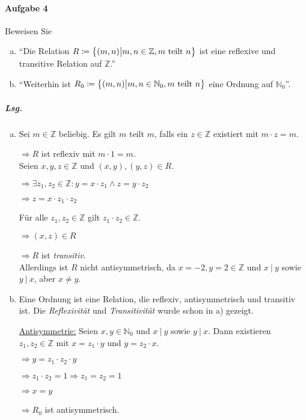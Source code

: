 \documentclass{scrreprt}
\begin{document}
\newpage
\paragraph{Aufgabe 4} Beweisen Sie
\begin{enumerate}[a)]
\item ``Die Relation
$R \coloneqq \qty\big{\qty(m, n) {\big |} m, n \in \mathbb{Z},
m \text{ teilt } n}$ ist eine reflexive und transitive Relation auf
$\mathbb{Z}$.''

\item ``Weiterhin ist
$R_0 \coloneqq \qty\big{(m, n) {\big |} m, n \in \mathbb{N}_0,
  m \text{ teilt } n}$ eine Ordnung auf $\mathbb{N}_0$''.
\end{enumerate}

\subparagraph{Lsg.}
\begin{enumerate}[a)]
\item Sei $m \in \mathbb{Z}$ beliebig.
Es gilt $m$ teilt $m$, falls ein $z \in \mathbb{Z}$ existiert mit
$m \cdot z = m$.

$\Rightarrow R$ ist reflexiv mit $m \cdot 1 = m$. \\

Seien $x, y, z \in \mathbb{Z}$ und $(x, y), (y, z) \in R$.

  $\Rightarrow \exists z_1, z_2 \in \mathbb{Z} \colon y = x \cdot z_1 \land z = y \cdot z_2$

  $\Rightarrow z = x \cdot z_1 \cdot z_2$

  Für alle $z_1, z_2 \in \mathbb{Z}$ gilt $z_1 \cdot z_2 \in \mathbb{Z}$.

  $\Rightarrow (x, z) \in R$

  $\Rightarrow R$ ist \emph{transitiv}. \\

  Allerdings ist $R$ nicht antisymmetrisch, da $x = -2, y = 2 \in \mathbb{Z}$
  und $x \:|\: y$ sowie $y \:|\: x$, aber $x \ne y$.

\item Eine Ordnung ist eine Relation, die reflexiv, antisymmetrisch und transitiv ist.
  Die \emph{Reflexivität} und \emph{Transitivität} wurde schon in a) gezeigt.

  \underline{Antisymmetrie:} Seien $x, y \in \mathbb{N}_0$ und $x \:|\: y$ sowie
  $y \:|\: x$.
  Dann existieren $z_1, z_2 \in \mathbb{Z}$ mit $x = z_1 \cdot y$ und
  $y = z_2 \cdot x$.

  $\Rightarrow y = z_1 \cdot z_2 \cdot y$

  $\Rightarrow z_1 \cdot z_2 = 1 \Rightarrow z_1 = z_2 = 1$

  $\Rightarrow x = y$

  $\Rightarrow R_0$ ist antisymmetrisch.
\end{enumerate}
\end{document}
